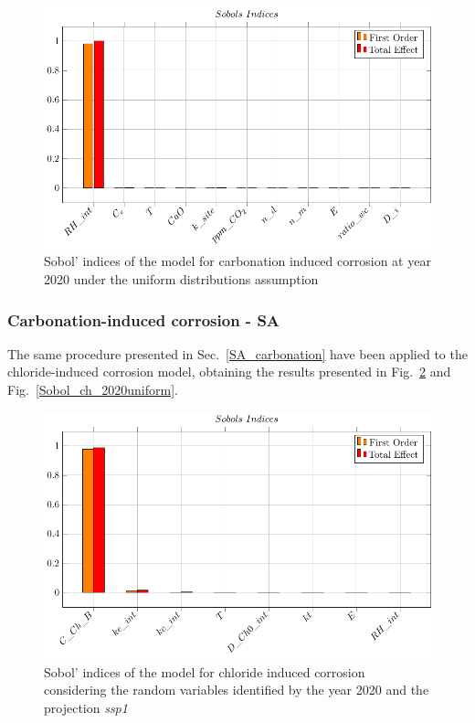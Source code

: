 \begin{figure}[H]
    \centering
    \includegraphics[width=\linewidth]{imgs/pdfs/sobols_indices/carbonation/17_sobols_2020_ssp1.pdf}
    \caption{Sobol' indices of the model for carbonation induced corrosion at year 2020 under the uniform distributions assumption}\label{Sobol_carb_2020uniform}
\end{figure}

\subsubsection{Carbonation-induced corrosion - SA}
The same procedure presented in Sec.~\ref{SA_carbonation} have been applied to the chloride-induced corrosion model, obtaining the results presented in Fig.~\ref{Sobol_ch_2020ssp1} and Fig.~\ref{Sobol_ch_2020uniform}.
\begin{figure}[H]
    \centering
    \includegraphics[width=\linewidth]{imgs/pdfs/sobols_indices/chloride/19_sobols_withRH_2020_ssp1.pdf}
    \caption{Sobol' indices of the model for chloride induced corrosion considering the random variables identified by the year 2020 and the projection \textit{ssp1}}\label{Sobol_ch_2020ssp1}
\end{figure}

